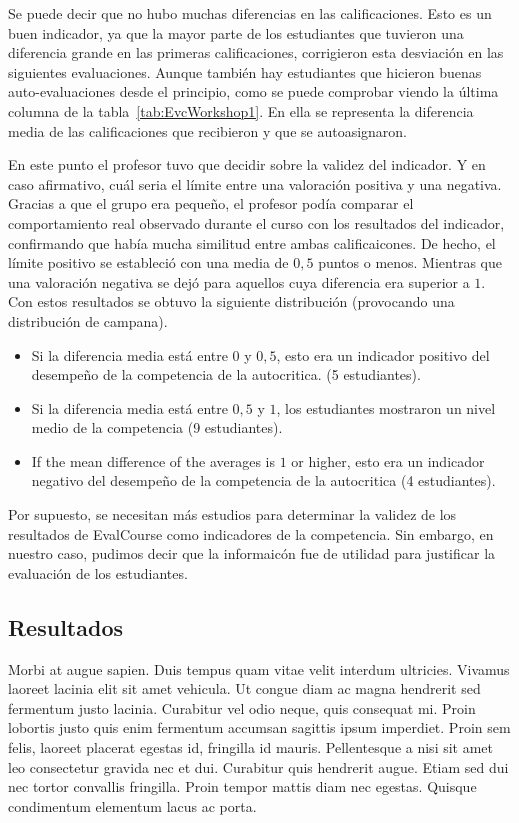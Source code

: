 Se puede decir que no hubo muchas diferencias en las calificaciones. Esto es un buen indicador, ya que la mayor parte de los estudiantes que tuvieron una diferencia grande en las primeras calificaciones, corrigieron esta desviación en las siguientes evaluaciones. Aunque también hay estudiantes que hicieron buenas auto-evaluaciones desde el principio, como se puede comprobar viendo la última columna de la tabla~\ref{tab:EvcWorkshop1}. En ella se representa la diferencia media de las calificaciones que recibieron y que se autoasignaron.

En este punto el profesor tuvo que decidir sobre la validez del indicador. Y en caso afirmativo, cuál seria el límite entre una valoración positiva y una negativa. Gracias a que el grupo era pequeño, el profesor podía comparar el comportamiento real observado durante el curso con los resultados del indicador, confirmando que había mucha similitud entre ambas calificaicones. De hecho, el límite positivo se estableció con una media de $0,5$ puntos o menos. Mientras que una valoración negativa se dejó para aquellos cuya diferencia era superior a $1$. Con estos resultados se obtuvo la siguiente distribución (provocando una distribución de campana).

\begin{itemize}
\item Si la diferencia media está entre $0$ y $0,5$, esto era un indicador positivo del desempeño de la competencia de la autocritica. (5 estudiantes).
\item Si la diferencia media está entre $0,5$ y $1$, los estudiantes mostraron un nivel medio de la competencia (9 estudiantes).
\item If the mean difference of the averages is $1$ or higher, esto era un indicador negativo del desempeño de la competencia de la autocritica (4 estudiantes).
\end{itemize}

Por supuesto, se necesitan más estudios para determinar la validez de los resultados de EvalCourse como indicadores de la competencia. Sin embargo, en nuestro caso, pudimos decir que la informaicón fue de utilidad para justificar la evaluación de los estudiantes.

\subsection{Resultados}

Morbi at augue sapien. Duis tempus quam vitae velit interdum ultricies. Vivamus laoreet lacinia elit sit amet vehicula. Ut congue diam ac magna hendrerit sed fermentum justo lacinia. Curabitur vel odio neque, quis consequat mi. Proin lobortis justo quis enim fermentum accumsan sagittis ipsum imperdiet. Proin sem felis, laoreet placerat egestas id, fringilla id mauris. Pellentesque a nisi sit amet leo consectetur gravida nec et dui. Curabitur quis hendrerit augue. Etiam sed dui nec tortor convallis fringilla. Proin tempor mattis diam nec egestas. Quisque condimentum elementum lacus ac porta.

